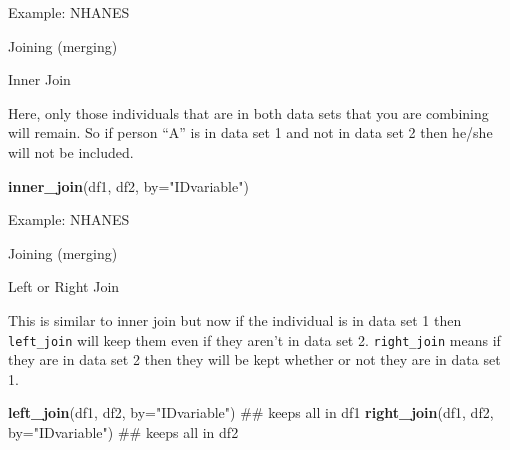 \documentclass[ignorenonframetext,]{beamer}
\newenvironment{Shaded}{\begin{snugshade}}{\end{snugshade}}
\newcommand{\KeywordTok}[1]{\textcolor[rgb]{0.13,0.29,0.53}{\textbf{{#1}}}}
\newcommand{\DataTypeTok}[1]{\textcolor[rgb]{0.13,0.29,0.53}{{#1}}}
\newcommand{\StringTok}[1]{\textcolor[rgb]{0.31,0.60,0.02}{{#1}}}
\newcommand{\NormalTok}[1]{{#1}}
\begin{document}
\begin{frame}[fragile]{Example: NHANES}

\begin{block}{Joining (merging)}

\begin{block}{Inner Join}

Here, only those individuals that are in both data sets that you are
combining will remain. So if person ``A'' is in data set 1 and not in
data set 2 then he/she will not be included.

\begin{Shaded}
\begin{Highlighting}[]
\KeywordTok{inner_join}\NormalTok{(df1, df2, }\DataTypeTok{by=}\StringTok{"IDvariable"}\NormalTok{)}
\end{Highlighting}
\end{Shaded}

\end{block}

\end{block}

\end{frame}

\begin{frame}[fragile]{Example: NHANES}

\begin{block}{Joining (merging)}

\begin{block}{Left or Right Join}

This is similar to inner join but now if the individual is in data set 1
then \texttt{left\_join} will keep them even if they aren't in data set
2. \texttt{right\_join} means if they are in data set 2 then they will
be kept whether or not they are in data set 1.

\begin{Shaded}
\begin{Highlighting}[]
\KeywordTok{left_join}\NormalTok{(df1, df2, }\DataTypeTok{by=}\StringTok{"IDvariable"}\NormalTok{)   ## keeps all in df1}
\KeywordTok{right_join}\NormalTok{(df1, df2, }\DataTypeTok{by=}\StringTok{"IDvariable"}\NormalTok{)  ## keeps all in df2}
\end{Highlighting}
\end{Shaded}

\end{block}

\end{block}

\end{frame}
\end{document}
